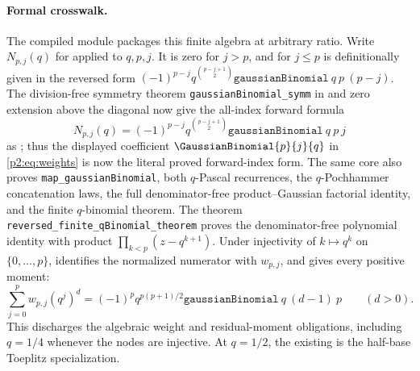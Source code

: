 \documentclass[11pt,oneside]{article}
\numberwithin{equation}{section}
\theoremstyle{definition}
\theoremstyle{remark}
\begin{document}
\paragraph{Formal crosswalk.}
The compiled module  packages this
finite algebra at arbitrary ratio.  Write \(N_{p,j}(q)\) for
 applied to \(q,p,j\).  It is zero for \(j>p\), and for
\(j\le p\) is definitionally given in the reversed form
\( (-1)^{p-j}q^{\binom{p-j+1}{2}}
\texttt{gaussianBinomial}\ q\ p\ (p-j)\).
The division-free symmetry theorem
\texttt{gaussianBinomial\_symm} in  and
zero extension above the diagonal now give the all-index forward formula
\[
 N_{p,j}(q)
 =(-1)^{p-j}q^{\binom{p-j+1}{2}}
   \texttt{gaussianBinomial}\ q\ p\ j
\]
as ; thus the
displayed coefficient \(\GaussianBinomial{p}{j}{q}\) in \eqref{p2:eq:weights} is now
the literal proved forward-index form.  The same core also proves
\texttt{map\_gaussianBinomial}, both \(q\)-Pascal recurrences, the
\(q\)-Pochhammer concatenation laws, the full denominator-free
product--Gaussian factorial identity, and the finite \(q\)-binomial theorem.
The theorem \texttt{reversed\_finite\_qBinomial\_theorem} proves the
denominator-free polynomial identity with product
\(\prod_{k<p}(z-q^{k+1})\).  Under injectivity of \(k\mapsto q^k\) on
\(\{0,\ldots,p\}\),
 identifies
the normalized numerator with \(w_{p,j}\), and
gives every positive moment:
\[
 \sum_{j=0}^{p}w_{p,j}(q^j)^d
 =(-1)^p q^{p(p+1)/2}
   \texttt{gaussianBinomial}\ q\ (d-1)\ p
 \qquad(d>0).
\]
This discharges the algebraic weight and residual-moment obligations,
including \(q=1/4\) whenever the nodes are injective.  At \(q=1/2\), the existing
 is the half-base
Toeplitz specialization.
\end{document}
